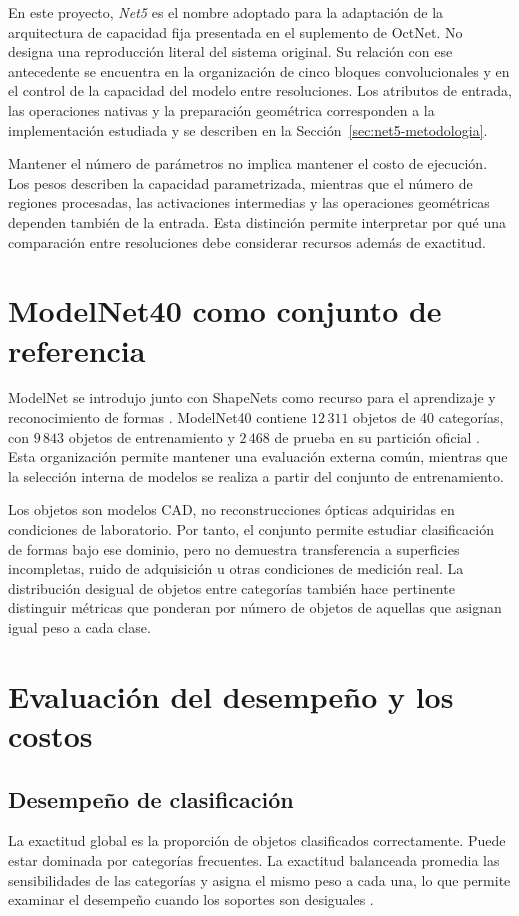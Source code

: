 En este proyecto, \emph{Net5} es el nombre adoptado para la adaptación de la arquitectura de capacidad fija presentada en el suplemento de OctNet. No designa una reproducción literal del sistema original. Su relación con ese antecedente se encuentra en la organización de cinco bloques convolucionales y en el control de la capacidad del modelo entre resoluciones. Los atributos de entrada, las operaciones nativas y la preparación geométrica corresponden a la implementación estudiada y se describen en la Sección~\ref{sec:net5-metodologia}.

Mantener el número de parámetros no implica mantener el costo de ejecución. Los pesos describen la capacidad parametrizada, mientras que el número de regiones procesadas, las activaciones intermedias y las operaciones geométricas dependen también de la entrada. Esta distinción permite interpretar por qué una comparación entre resoluciones debe considerar recursos además de exactitud.

\section{ModelNet40 como conjunto de referencia}
\label{sec:modelnet40}
ModelNet se introdujo junto con ShapeNets como recurso para el aprendizaje y reconocimiento de formas \parencite{wu2015}. ModelNet40 contiene $12\,311$ objetos de 40 categorías, con $9\,843$ objetos de entrenamiento y $2\,468$ de prueba en su partición oficial \parencite{modelnet}. Esta organización permite mantener una evaluación externa común, mientras que la selección interna de modelos se realiza a partir del conjunto de entrenamiento.

Los objetos son modelos CAD, no reconstrucciones ópticas adquiridas en condiciones de laboratorio. Por tanto, el conjunto permite estudiar clasificación de formas bajo ese dominio, pero no demuestra transferencia a superficies incompletas, ruido de adquisición u otras condiciones de medición real. La distribución desigual de objetos entre categorías también hace pertinente distinguir métricas que ponderan por número de objetos de aquellas que asignan igual peso a cada clase.

\section{Evaluación del desempeño y los costos}
\label{sec:evaluacion-costo}
\subsection{Desempeño de clasificación}
La exactitud global es la proporción de objetos clasificados correctamente. Puede estar dominada por categorías frecuentes. La exactitud balanceada promedia las sensibilidades de las categorías y asigna el mismo peso a cada una, lo que permite examinar el desempeño cuando los soportes son desiguales \parencite{brodersen2010}.

